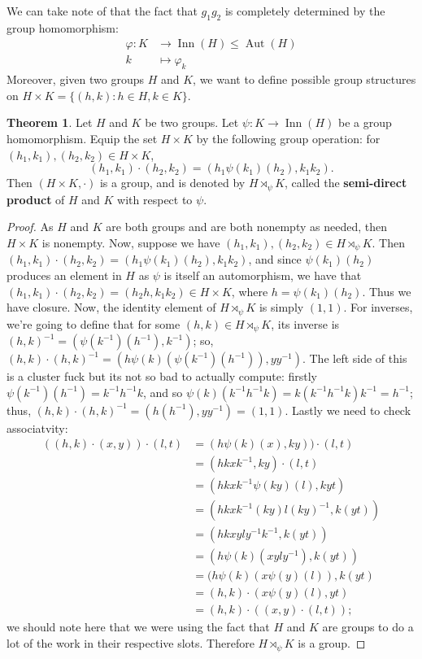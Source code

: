 \documentclass[9pt,reqno]{amsart}
\theoremstyle{definition}
\newtheorem{theorem}{Theorem}[section]
\DeclareMathOperator{\aut}{Aut}
\DeclareMathOperator{\inn}{Inn}
\newcommand{\lra}{\longrightarrow}
\newcommand{\lmt}{\longmapsto}
\begin{document}
We can take note of that the fact that $g_1 g_2$ is completely determined by the group homomorphism: 
\begin{align*} \varphi \colon K &\lra \inn (H) \leq \aut (H) \\  
k &\lmt \varphi_k 
\end{align*}
Moreover, given two groups $H$ and $K$, we want to define possible group structures on $H \times K = \{ (h, k) \colon h \in H, k \in K \}$. 
\begin{theorem} Let $H$ and $K$ be two groups. Let $\psi \colon K \lra \inn (H)$ be a group homomorphism. Equip the set $H \times K$ by the following group operation: for $(h_1, k_1), (h_2, k_2)  \in H \times K$, 
\[ (h_1, k_1) \cdot (h_2, k_2) = (h_1 \psi (k_1) (h_2), k_1 k_2 ) .\]
Then $(H \times K, \cdot)$ is a group, and is denoted by $H \rtimes_\psi K$, called the \textbf{semi-direct product} of $H$ and $K$ with respect to $\psi$. 
\begin{proof} As $H$ and $K$ are both groups and are both nonempty as needed, then $H \times K$ is nonempty. Now, suppose we have $(h_1, k_1), (h_2, k_2) \in H \rtimes_\psi K$. Then $(h_1, k_1) \cdot (h_2, k_2) = (h_1 \psi (k_1) (h_2), k_1 k_2 )$, and since $\psi (k_1) (h_2)$ produces an element in $H$ as $\psi$ is itself an automorphism, we have that $(h_1, k_1) \cdot (h_2, k_2) = (h_2 h, k_1 k_2 ) \in H \times K$, where $h = \psi (k_1) (h_2)$. Thus we have closure. Now, the identity element of $H \rtimes_\psi K$ is simply $(1, 1)$. For inverses, we're going to define that for some $(h, k) \in H \rtimes_\psi K$, its inverse is $(h, k)^{-1} = (\psi(k^{-1} )(h^{-1}) , k^{-1})$; so, $(h, k) \cdot (h, k)^{-1} = (h \psi (k)( \psi (k^{-1} ) (h^{-1} )) , yy^{-1} )$. The left side of this is a cluster fuck but its not so bad to actually compute: firstly $\psi (k^{-1} )(h^{-1}) = k^{-1} h^{-1} k$, and so $\psi (k) ( k^{-1} h^{-1} k) = k (k^{-1} h^{-1} k) k^{-1} =  h^{-1}$; thus, $(h, k) \cdot (h, k)^{-1} = (h(h^{-1}) , yy^{-1}) = (1, 1)$. Lastly we need to check associatvity:
\begin{align*}
 ( (h, k) \cdot (x, y) ) \cdot (l, t) &= (h \psi (k) (x), ky) ) \cdot (l, t)  \\
 &= (h kxk^{-1}, ky) \cdot (l, t) \\
 &= ( h kxk^{-1} \psi (ky) (l), kyt ) \\
 &= ( hkxk^{-1} (ky) l (ky)^{-1}, k(yt)) \\
 &= (hkx yly^{-1} k^{-1}, k(yt))  \\
 &= (h \psi(k) (xyly^{-1}) , k(yt)) \\
 &= (h \psi (k) (x\psi(y)(l)), k(yt) \\
  &= (h, k) \cdot (x \psi(y)(l), yt) \\ 
 &= (h, k) \cdot ( (x, y) \cdot (l, t)) ; 
\end{align*} 
we should note here that we were using the fact that $H$ and $K$ are groups to do a lot of the work in their respective slots. Therefore $H \rtimes_\psi K$ is a group. 
\end{proof}
\end{theorem}
\end{document}
